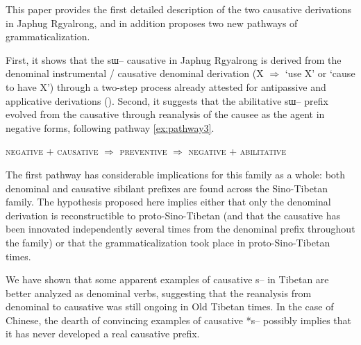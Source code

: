 \documentclass[oldfontcommands,oneside,a4paper,11pt]{article}
\newcommand{\ipa}[1]{{\phon \mbox{#1}}} %
\begin{document}
This paper   provides the first detailed description of the two causative derivations in Japhug Rgyalrong, and in addition  proposes two new pathways of grammaticalization.

 First, it shows that the \ipa{sɯ--} causative in Japhug Rgyalrong is derived from the denominal instrumental  / causative denominal derivation (X $\Rightarrow$ `use X' or `cause to have X') through a two-step process already attested for antipassive and applicative derivations (\citealt{jacques14antipassive}). Second, it   suggests that the abilitative \ipa{sɯ--} prefix evolved from the causative through reanalysis of the causee as the agent in negative forms, following pathway \ref{ex:pathway3}.
 
{\small
\begin{exe}
\ex \label{ex:pathway3}
\glt \textsc{negative}   + \textsc{causative} $\Rightarrow$ \textsc{preventive} $\Rightarrow$ \textsc{negative} +  \textsc{abilitative} 
\end{exe}
}

The first pathway has considerable implications for this family as a whole: both denominal and causative sibilant prefixes are found across the Sino-Tibetan family. The hypothesis proposed here implies either that only the denominal derivation is reconstructible to proto-Sino-Tibetan (and that the causative has been innovated independently several times from the denominal prefix throughout the family) or that the grammaticalization took place in proto-Sino-Tibetan times.

We have shown that  some apparent examples of causative \ipa{s--} in Tibetan are better analyzed as denominal verbs, suggesting that the reanalysis from denominal to causative was still ongoing in Old Tibetan times. In the case of Chinese, the dearth of convincing examples of causative *\ipa{s--} possibly implies that it has never developed a real causative prefix.



\end{document}

